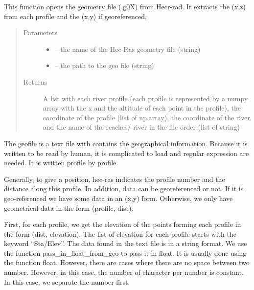 \documentclass[letterpaper,10pt,english]{sphinxmanual}
\begin{document}
\begin{fulllineitems}
\label{\detokenize{index:src.Hec_ras06.open_geofile}}
This function opens the geometry file (.g0X) from Hecr-rad. It extracts the (x,z) from each profile
and the (x,y) if georeferenced,
\begin{quote}\begin{description}
\item[{Parameters}] \leavevmode\begin{itemize}
\item {} 
 -- the name of the Hec-Ras geometry file (string)

\item {} 
 -- the path to the geo file (string)

\end{itemize}

\item[{Returns}] \leavevmode
A list with each river profile (each profile is represented by a numpy array with the x and the altitude
of each point in the profile), the coordinate of the profile (list of np.array),
the coordinate of the river and the name of the reaches/ river in the file order (list of string)

\end{description}\end{quote}


The geofile is a text file with contains the geographical information. Because it is written to be read by human,
it is complicated to load and regular expression are needed. It is written profile by profile.

Generally, to give a position, hec-ras indicates the profile number and the distance along this profile. In addition,
data can be georeferenced or not. If it is geo-referenced we have some data in an (x,y) form. Otherwise, we only
have geometrical data in the form (profile, dist).

First, for each profile, we get the elevation of the points forming each profile in the form (dist, elevation).
The list of elevation for each profile starts with the keyword “Sta/Elev”. The data found in the text file is in a
string format. We use the function pass\_in\_float\_from\_geo to pass it in float. It is usually done using the function
float. However, there are cases where there are no space between two number. However, in this case, the number of
character per number is constant. In this case, we separate the number first.


\end{fulllineitems}
\end{document}
